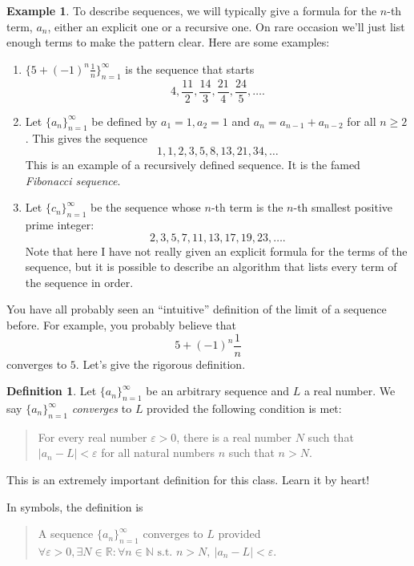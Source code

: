 \documentclass[12pt]{amsart}
\def\e{\varepsilon}
\newcommand{\R}{{\mathbb{R}}}
\newcommand{\N}{\mathbb{N}}
\numberwithin{equation}{section}
\theoremstyle{plain} %
\theoremstyle{definition}
\newtheorem{defn}[equation]{Definition}
\newtheorem{ex}[equation]{Example}
\theoremstyle{remark}
\begin{document}
\begin{ex} To describe sequences, we will typically give a formula for the $n$-th term, $a_n$, either an explicit one or a recursive one. On rare occasion we'll
  just list enough terms to make the pattern clear. Here are some examples:
\begin{enumerate}

\item $\{5 + (-1)^n \frac{1}{n}\}_{n=1}^\infty$ is the sequence that starts
$$
4, \frac{11}2,  \frac{14}{3}, \frac{21}4, \frac{24}5, \dots.
$$

\item Let $\{a_n\}_{n=1}^\infty$ be defined by $a_1 = 1, a_2 = 1$ and $a_n = a_{n-1} + a_{n-2}$ for all $n \geq 2$. This gives the sequence
$$
1, 1, 2, 3, 5, 8, 13, 21, 34, \dots
$$
This is an example of a recursively defined sequence. It is the famed {\em Fibonacci sequence}. 

\item Let $\{c_n\}_{n=1}^\infty$ be the sequence whose $n$-th term is the $n$-th smallest positive prime integer:
$$
2, 3, 5, 7, 11, 13, 17, 19, 23, \dots.
$$
Note that here I have not really given an explicit formula for the terms of the sequence, but it is possible to describe an algorithm that lists every term of the sequence in
order.
\end{enumerate}

\end{ex}


You have all probably seen an ``intuitive'' definition of the limit of a sequence before. For example, you probably believe that
$$
5 + (-1)^n \frac{1}{n}
$$
converges to $5$.
Let's give the rigorous definition.

\begin{defn} Let $\{a_n\}_{n=1}^\infty$ be an arbitrary sequence and $L$ a real number. We say $\{a_n\}_{n=1}^\infty$ {\em converges} to $L$ provided the
  following condition is met:
\begin{quote}
For every real number $\e > 0$, there is a real number $N$ such that $|a_n - L| < \e$ for all natural numbers $n$ such that $n > N$.
\end{quote}
\end{defn}

This is an extremely important definition for this class. Learn it by heart!





In symbols, the definition is 
\begin{quote}
A sequence $\{a_n\}_{n=1}^\infty$ converges to $L$ provided\\
$\forall \e >0, {\exists N \in \R} : {\forall n \in \N} \text{ s.t. } n > N, \ {|a_n - L| < \e}$. 
\end{quote}
\end{document}
